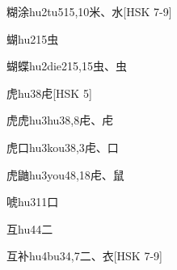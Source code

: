 \begin{EntryWithPhonetic}{糊涂}{hu2tu5}{15,10}{⽶、⽔}[HSK 7-9]
\end{EntryWithPhonetic}

\begin{EntryWithPhonetic}{蝴}{hu2}{15}{⾍}
\end{EntryWithPhonetic}

\begin{EntryWithPhonetic}{蝴蝶}{hu2die2}{15,15}{⾍、⾍}
\end{EntryWithPhonetic}

\begin{EntryWithPhonetic}{虎}{hu3}{8}{⾌}[HSK 5]
\end{EntryWithPhonetic}

\begin{EntryWithPhonetic}{虎虎}{hu3hu3}{8,8}{⾌、⾌}
\end{EntryWithPhonetic}

\begin{EntryWithPhonetic}{虎口}{hu3kou3}{8,3}{⾌、⼝}
\end{EntryWithPhonetic}

\begin{EntryWithPhonetic}{虎鼬}{hu3you4}{8,18}{⾌、⿏}
\end{EntryWithPhonetic}

\begin{EntryWithPhonetic}{唬}{hu3}{11}{⼝}
\end{EntryWithPhonetic}

\begin{EntryWithPhonetic}{互}{hu4}{4}{⼆}
\end{EntryWithPhonetic}

\begin{EntryWithPhonetic}{互补}{hu4bu3}{4,7}{⼆、⾐}[HSK 7-9]
\end{EntryWithPhonetic}

